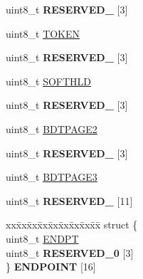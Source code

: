 \begin{DoxyCompactItemize}
uint8\+\_\+t {\bfseries R\+E\+S\+E\+R\+V\+E\+D\+\_} \mbox{[}3\mbox{]}
\item 
uint8\+\_\+t \hyperlink{struct_u_s_b___mem_map_a8806f493a96bf80f94a1b04fd5a595a7}{T\+O\+K\+EN}
\item 
\mbox{\label{struct_u_s_b___mem_map_af1b3dbe2aa5bd0b752abbdf9c29d70b6}} 
uint8\+\_\+t {\bfseries R\+E\+S\+E\+R\+V\+E\+D\+\_} \mbox{[}3\mbox{]}
\item 
uint8\+\_\+t \hyperlink{struct_u_s_b___mem_map_a5462ecd3a3fe1425826815c78bfb8120}{S\+O\+F\+T\+H\+LD}
\item 
\mbox{\label{struct_u_s_b___mem_map_ae58f8f823509af251c9145ef32f35c82}} 
uint8\+\_\+t {\bfseries R\+E\+S\+E\+R\+V\+E\+D\+\_} \mbox{[}3\mbox{]}
\item 
uint8\+\_\+t \hyperlink{struct_u_s_b___mem_map_abb9113fced941f9af402d501dd6dc301}{B\+D\+T\+P\+A\+G\+E2}
\item 
\mbox{\label{struct_u_s_b___mem_map_a443f87251df6c05ff456e604ca853052}} 
uint8\+\_\+t {\bfseries R\+E\+S\+E\+R\+V\+E\+D\+\_} \mbox{[}3\mbox{]}
\item 
uint8\+\_\+t \hyperlink{struct_u_s_b___mem_map_afd1f5b8867e36b32297641c5fe0b283b}{B\+D\+T\+P\+A\+G\+E3}
\item 
\mbox{\label{struct_u_s_b___mem_map_a3fd06de5424ba76a2ad43d024b8602cd}} 
uint8\+\_\+t {\bfseries R\+E\+S\+E\+R\+V\+E\+D\+\_} \mbox{[}11\mbox{]}
\item 
\mbox{\label{struct_u_s_b___mem_map_a08b26653cb0bb4345ab30a51d2ce6958}} 
\begin{tabbing}
xx\=xx\=xx\=xx\=xx\=xx\=xx\=xx\=xx\=\kill
struct \{\\
\>uint8\_t \hyperlink{struct_u_s_b___mem_map_a86aaba02227a45a333f72565b0bec378}{ENDPT}\\
\>uint8\_t {\bfseries RESERVED\_0} \mbox{[}3\mbox{]}\\
\} {\bfseries ENDPOINT} \mbox{[}16\mbox{]}\\


\end{tabbing}
\end{DoxyCompactItemize}
